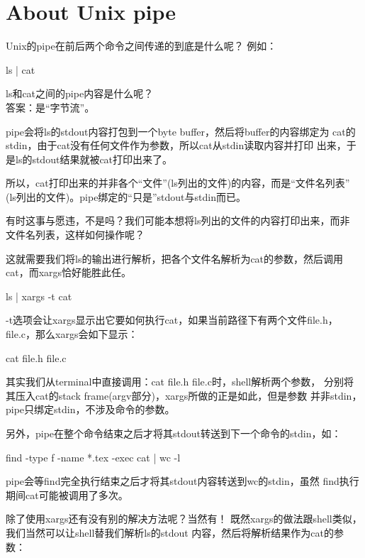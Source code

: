 \documentclass[a4paper,11pt]{article}
\begin{document}
  \section[About Unix Pipe]{About Unix pipe}
  Unix的pipe在前后两个命令之间传递的到底是什么呢？
  例如：

  \begin{bashcode}
    ls | cat
  \end{bashcode}

  ls和cat之间的pipe内容是什么呢？\\
  答案：是“字节流”。

  pipe会将ls的stdout内容打包到一个byte buffer，然后将buffer的内容绑定为
  cat的stdin，由于cat没有任何文件作为参数，所以cat从stdin读取内容并打印
  出来，于是ls的stdout结果就被cat打印出来了。

  所以，cat打印出来的并非各个“文件”(ls列出的文件)的内容，而是“文件名列表”
  (ls列出的文件)。pipe绑定的“只是”stdout与stdin而已。

  有时这事与愿违，不是吗？我们可能本想将ls列出的文件的内容打印出来，而非
  文件名列表，这样如何操作呢？

  这就需要我们将ls的输出进行解析，把各个文件名解析为cat的参数，然后调用
  cat，而xargs恰好能胜此任。

  \begin{bashcode}
    ls | xargs -t cat
  \end{bashcode}

  -t选项会让xargs显示出它要如何执行cat，如果当前路径下有两个文件file.h，
  file.c，那么xargs会如下显示：

  \begin{bashcode}
    cat file.h file.c
  \end{bashcode}

  其实我们从terminal中直接调用：cat file.h file.c时，shell解析两个参数，
  分别将其压入cat的stack frame(argv部分)，xargs所做的正是如此，但是参数
  并非stdin，pipe只绑定stdin，不涉及命令的参数。

  另外，pipe在整个命令结束之后才将其stdout转送到下一个命令的stdin，如：

  \begin{bashcode}
    find -type f -name *.tex -exec cat {} \; | wc -l
  \end{bashcode}

  pipe会等find完全执行结束之后才将其stdout内容转送到wc的stdin，虽然
  find执行期间cat可能被调用了多次。


  除了使用xargs还有没有别的解决方法呢？当然有！
  既然xargs的做法跟shell类似，我们当然可以让shell替我们解析ls的stdout
  内容，然后将解析结果作为cat的参数：
\end{document}
